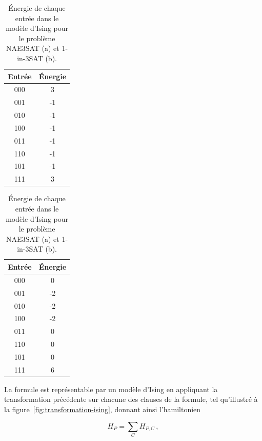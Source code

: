 \begin{table}[h]
    \centering
    \begin{subtable}{0.4\textwidth}
        \centering
        \begin{tabular}{c c}
            \hline
            Entrée & Énergie \\
            \hline
            000 & 3 \\
            001 & -1 \\
            010 & -1 \\
            100 & -1 \\
            011 & -1 \\
            110 & -1 \\
            101 & -1 \\
            111 & 3 \\
            \hline
        \end{tabular}
        \caption{}
        \label{tab:energie-nae3sat}
    \end{subtable}
    \begin{subtable}{0.4\textwidth}
        \centering
        \begin{tabular}{c c}
            \hline
            Entrée & Énergie \\
            \hline
            000 & 0 \\
            001 & -2 \\
            010 & -2 \\
            100 & -2 \\
            011 & 0 \\
            110 & 0 \\
            101 & 0 \\
            111 & 6 \\
            \hline
        \end{tabular}
        \caption{}
        \label{tab:energie-1in3sat}
    \end{subtable}
    \caption{Énergie de chaque entrée dans le modèle d'Ising pour le problème NAE3SAT (a) et 1-in-3SAT (b).}
\end{table}

La formule est représentable par un modèle d'Ising en appliquant la transformation précédente sur chacune des clauses de la formule, tel qu'illustré à la figure~\ref{fig:transformation-ising}, donnant ainsi l'hamiltonien 

\begin{equation}
    H_{P} = \sum_{C} H_{P, C} \,,
\end{equation}


